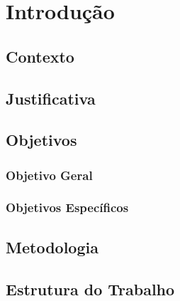\chapter{Introdução}
\label{cap:introducao}

\section{Contexto}

\section{Justificativa}

\section{Objetivos}

\subsection{Objetivo Geral}

\subsection{Objetivos Específicos}

\section{Metodologia}

\section{Estrutura do Trabalho}



